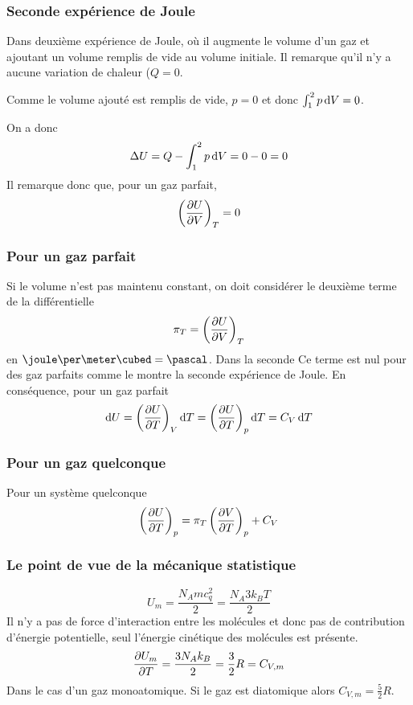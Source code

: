 \subsubsection{Seconde expérience de Joule}
Dans deuxième expérience de Joule,
où il augmente le volume d'un gaz et ajoutant
un volume remplis de vide au volume initiale.
Il remarque qu'il n'y a aucune variation de chaleur ($Q = 0$.

Comme le volume ajouté est remplis de vide, $p = 0$ et donc
$\int_1^2 p \operatorname{d}\! V = 0$.

On a donc
\[ \Delta U = Q - \int_1^2 p \operatorname{d}\! V  = 0 - 0 = 0 \]
Il remarque donc que, pour un gaz parfait,
\[ \left(\frac{\partial U}{\partial V}\right)_T = 0 \]

\subsubsection{Pour un gaz parfait}
Si le volume n'est pas maintenu constant,
on doit considérer le deuxième terme de la différentielle
\[ \pi_T = \left(\frac{\partial U}{\partial V}\right)_T \]
en $\joule\per\meter\cubed = \pascal$.
Dans la seconde
Ce terme est nul pour des gaz parfaits comme le montre
la seconde expérience de Joule.
En conséquence, pour un gaz parfait
\begin{equation}
  \operatorname{d}\! U = \left(\frac{\partial U}{\partial T}\right)_V \operatorname{d}\! T =
  \left(\frac{\partial U}{\partial T}\right)_p \operatorname{d}\! T = C_V\operatorname{d}\! T \label{eq:peru}
\end{equation}

\subsubsection{Pour un gaz quelconque}
Pour un système quelconque
\begin{equation}
  \left(\frac{\partial U}{\partial T}\right)_p =
  \pi_T \left(\frac{\partial V}{\partial T}\right)_p + C_V \label{eq:dudtp}
\end{equation}

\subsubsection{Le point de vue de la mécanique statistique}
\[ U_m = \frac{N_A mc_q^2}{2} = \frac{N_A 3k_BT}{2} \]
Il n'y a pas de force d'interaction entre les molécules et
donc pas de contribution d'énergie potentielle,
seul l'énergie cinétique des molécules est présente.
\[ \frac{\partial U_m}{\partial T} = \frac{3N_A k_B}{2} = \frac 32R = C_{V,m} \]
Dans le cas d'un gaz monoatomique.
Si le gaz est diatomique alors $C_{V,m} = \frac 52R$.

